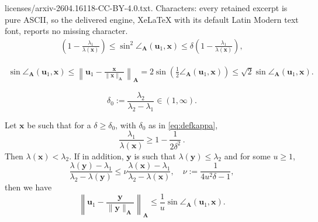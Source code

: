 \documentclass[10pt,a4paper]{amsart}
\newcommand{\A}{\ten A}
\newcommand{\ten}[1]{\boldsymbol{#1}}
\begin{document}
licenses/arxiv-2604.16118-CC-BY-4.0.txt. Characters: every retained excerpt is pure ASCII, so the delivered engine, XeLaTeX with its default Latin Modern text font, reports no missing character.
\begin{align}\label{eq:sinbound}
 \left( 1 - \frac{\lambda_1}{\lambda(\ten x)} \right) \leq \sin^2 \angle_{\ten A}(\ten{u}_1,\ten x) \leq 
   \delta \left( 1 - \frac{\lambda_1}{\lambda(\ten x)} \right),
\end{align}

\begin{align}\label{eq:2ndsinbound}
  \sin \angle_{\ten A}(\ten{u}_1,\ten x) \leq \left\|\ten{u}_1 - \frac{\ten x}{\|\ten x\|_{\A}} \right\|_{\A} = 2 \sin \left(\frac{1}{2} \angle_{\A}(\ten{u}_1,\ten x) \right)  \leq \sqrt{2} \sin \angle_{\ten A}(\ten{u}_1,\ten x).
\end{align}

\begin{equation}\label{eq:defkappa}
%
 \delta_0 := \frac{\lambda_2}{\lambda_2 - \lambda_1} \in (1,\infty).
\end{equation}

\begin{lemma}\label{rankoptaprior}
Let $\ten x$ be such that for a $\delta \geq \delta_0$, with $\delta_0$ as in \eqref{eq:defkappa},
\begin{equation}\label{assrankopt}
%
 \frac{\lambda_1}{\lambda(\ten x)} \geq 1 - \frac{1}{2 \delta^2}    \,.
\end{equation}
%
%
%
Then $\lambda(\ten x) < \lambda_2$. If in addition, $\ten y$ is such that $\lambda(\ten y) \leq \lambda_2$ and for some $u \geq 1$,
\begin{equation}\label{actualineq}
 \frac{\lambda(\ten y) - \lambda_1}{\lambda_2 - \lambda(\ten y)} \leq \nu  \frac{\lambda(\ten{x}) - \lambda_1}{\lambda_2 - \lambda(\ten{x})} , \quad \nu := \frac{1}{4 u^2 \delta  - 1},
\end{equation} 
 then we have
 \begin{equation}\label{eq:normubound}
  \left\| \ten u_1 - \frac{\ten y}{\|\ten y\|_{\A}} \right\|_{\A} \leq \frac{1}{u} \sin \angle_{\A}(\ten u_1,\ten x).
\end{equation}
\end{lemma}
\end{document}
